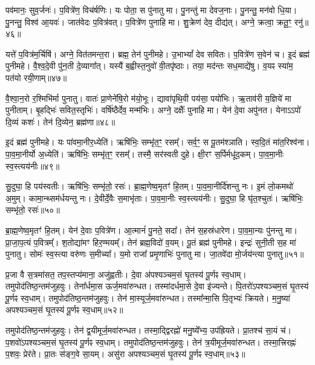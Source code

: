 पव॑मानः॒ सुव॒र्जनः॑।
प॒वित्रे॑ण॒ विच॑र्\mbox{}षणिः।
यः पोता॒ स पु॑नातु मा।
पु॒नन्तु॑ मा देवज॒नाः।
पु॒नन्तु॒ मन॑वो धि॒या।
पु॒नन्तु॒ विश्व॑ आ॒यवः॑।
जात॑वेदः प॒वित्र॑वत्।
प॒वित्रे॑ण पुनाहि मा।
शु॒क्रेण॑ देव॒ दीद्य॑त्।
अग्ने॒ क्रत्वा॒ क्रतू॒ꣳ॒ रनु॑\-॥४६॥\ip

यत्ते॑ प॒वित्र॑म॒र्चिषि॑।
अग्ने॒ वित॑तमन्त॒रा।
ब्रह्म॒ तेन॑ पुनीमहे।
उ॒भाभ्यां᳚ देव सवितः।
प॒वित्रे॑ण स॒वेन॑ च।
इ॒दं ब्रह्म॑ पुनीमहे।
वै॒श्व॒दे॒वी पु॑न॒ती दे॒व्यागा᳚त्।
यस्यै॑ ब॒ह्वीस्त॒नुवो॑ वी॒तपृ॑ष्ठाः।
तया॒ मद॑न्तः सध॒माद्ये॑षु।
व॒यꣴ स्या॑म॒ पत॑यो रयी॒णाम्॥४७॥\ip

वै॒श्वा॒न॒रो र॒श्मिभि॑र्मा पुनातु।
वातः॑ प्रा॒णेने॑षि॒रो म॑यो॒भूः।
द्यावा॑पृथि॒वी पय॑सा॒ पयो॑भिः।
ऋ॒ताव॑री य॒ज्ञिये॑ मा पुनीताम्।
बृ॒हद्भिः॑ सवित॒स्तृभिः॑।
वर्\mbox{}षि॑ष्ठैर्देव॒ मन्म॑भिः।
अग्ने॒ दक्षैः᳚ पुनाहि मा।
येन॑ दे॒वा अपु॑नत।
येनाऽऽपो॑ दि॒व्यं कशः॑।
तेन॑ दि॒व्येन॒ ब्रह्म॑णा॥४८॥\ip

इ॒दं ब्रह्म॑ पुनीमहे।
यः पा॑वमा॒नीर॒ध्येति॑।
ऋषि॑भिः॒ सम्भृ॑त॒ꣳ॒ रसम्᳚।
सर्व॒ꣳ॒ स पू॒तम॑श्ञाति।
स्व॒दि॒तं मा॑त॒रिश्व॑ना।
पा॒व॒मा॒नीर्यो अ॒ध्येति॑।
ऋषि॑भिः॒ सम्भृ॑त॒ꣳ॒ रसम्᳚।
तस्मै॒ सर॑स्वती दुहे।
क्षी॒रꣳ स॒र्पिर्मधू॑द॒कम्।
पा॒व॒मा॒नीः स्व॒स्त्यय॑नीः॥४९॥\ip

सु॒दुघा॒ हि पय॑स्वतीः।
ऋषि॑भिः॒ सम्भृ॑तो॒ रसः॑।
ब्रा॒ह्म॒णेष्व॒मृतꣳ॑ हि॒तम्।
पा॒व॒मा॒नीर्दि॑शन्तु नः।
इ॒मं लो॒कमथो॑ अ॒मुम्।
कामा॒न्थ्सम॑र्धयन्तु नः।
दे॒वीर्दे॒वैः स॒माभृ॑ताः।
पा॒व॒मा॒नीः स्व॒स्त्यय॑नीः।
सु॒दुघा॒ हि घृ॑त॒श्चुतः॑।
ऋषि॑भिः॒ सम्भृ॑तो॒ रसः॑॥५०॥\ip

ब्रा॒ह्म॒णेष्व॒मृतꣳ॑ हि॒तम्।
येन॑ दे॒वाः प॒वित्रे॑ण।
आ॒त्मानं॑ पु॒नते॒ सदा᳚।
तेन॑ स॒हस्र॑धारेण।
पा॒व॒मा॒न्यः पु॑नन्तु मा।
प्रा॒जा॒प॒त्यं प॒वित्रम्᳚।
श॒तोद्या॑मꣳ हिर॒ण्मयम्᳚।
तेन॑ ब्रह्म॒विदो॑ व॒यम्।
पू॒तं ब्रह्म॑ पुनीमहे।
इन्द्रः॑ सुनी॒ती स॒ह मा॑ पुनातु।
सोमः॑ स्व॒स्त्या वरु॑णः स॒मीच्या᳚।
य॒मो राजा᳚ प्रमृ॒णाभिः॑ पुनातु मा।
जा॒तवे॑दा मो॒र्जय॑न्त्या पुनातु॥५१॥\ip\anuvakamend[अनु॑ रयी॒णां ब्रह्म॑णा स्व॒स्त्यय॑नीः सु॒दुघा॒ हि घृ॑त॒श्चुत॒ ऋषि॑भिः॒ सम्भृ॑तो॒ रसः॑ पुनातु॒ त्रीणि॑ च]

प्र॒जा वै स॒त्रमा॑सत॒ तप॒स्तप्य॑माना॒ अजु॑ह्वतीः।
दे॒वा अ॑पश्यञ्चम॒सं घृ॒तस्य॑ पू॒र्णꣴ स्व॒धाम्।
तमुपोद॑तिष्ठ॒न्तम॑\-जुहवुः।
तेना᳚र्धमा॒स ऊर्ज॒मवा॑रुन्धत।
तस्मा॑दर्धमा॒से दे॒वा इ॑ज्यन्ते।
पि॒तरो॑\-ऽपश्यञ्चम॒सं घृ॒तस्य॑ पू॒र्णꣴ स्व॒धाम्।
तमुपोद॑तिष्ठ॒न्तम॑जुहवुः।
तेन॑ मा॒स्यूर्ज॒मवा॑रुन्धत।
तस्मा᳚न्मा॒सि पि॒तृभ्यः॑ क्रियते।
म॒नु॒ष्या॑ अपश्यञ्चम॒सं घृ॒तस्य॑ पू॒र्णꣴ स्व॒धाम्॥५२॥\ip

तमुपोद॑तिष्ठ॒न्तम॑जुहवुः।
तेन॑ द्व॒यीमूर्ज॒मवा॑रुन्धत।
तस्मा॒द्द्विरह्नो॑ मनु॒ष्ये᳚भ्य॒ उप॑ह्रियते।
प्रा॒तश्च॑ सा॒यं च॑।
प॒शवो॑\-ऽपश्यञ्चम॒सं घृ॒तस्य॑ पू॒र्णꣴ स्व॒धाम्।
तमुपोद॑तिष्ठ॒न्त\-म॑जुहवुः।
तेन॑ त्र॒यीमूर्ज॒मवा॑रुन्धत।
तस्मा॒त्त्रिरह्नः॑ प॒शवः॒ प्रेर॑ते।
प्रा॒तः स॑ङ्ग॒वे सा॒यम्।
असु॑रा अपश्यञ्चम॒सं घृ॒तस्य॑ पू॒र्णꣴ स्व॒धाम्॥५३॥\ip

